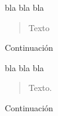 
% 		





bla bla bla \blockquote[{\cite[p.150]{bibKey}}]{Texto}. Continuación






bla bla bla \blockquote[{\cite[p.150]{bibKey}}]{Texto.} Continuación


